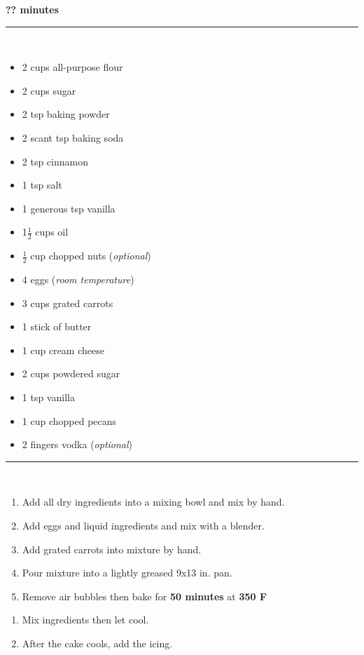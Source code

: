  \hfill {\large \textbf{?? minutes}}

\vspace{15pt} \hrule \vspace{15pt}
 \vspace{10pt}
\\
\begin{itemize}
	\item 2 cups all-purpose flour
	\item 2 cups sugar
	\item 2 tsp baking powder
	\item 2 scant tsp baking soda
	\item 2 tsp cinnamon
	\item 1 tsp salt
	\item 1 generous tsp vanilla
	\item 1$\frac{1}{2}$ cups oil
	\item $\frac{1}{2}$ cup chopped nuts (\textit{optional})
	\item 4 eggs (\textit{room temperature})
	\item 3 cups grated carrots
\end{itemize}
\begin{itemize}
	\item 1 stick of butter
	\item 1 cup cream cheese
	\item 2 cups powdered sugar
	\item 1 tsp vanilla
	\item 1 cup chopped pecans
	\item 2 fingers vodka (\textit{optional})
\end{itemize}

\vspace{15pt} \hrule \vspace{15pt}
 \vspace{10pt}
\\
\begin{enumerate}
	\item Add all dry ingredients into a mixing bowl and mix by hand.
	\item Add eggs and liquid ingredients and mix with a blender.
	\item Add grated carrots into mixture by hand.
	\item Pour mixture into a lightly greased 9x13 in. pan.
	\item Remove air bubbles then bake for \textbf{50 minutes} at \textbf{350 F}
\end{enumerate}
\begin{enumerate}
	\item Mix ingredients then let cool.
	\item After the cake cools, add the icing.
\end{enumerate}
